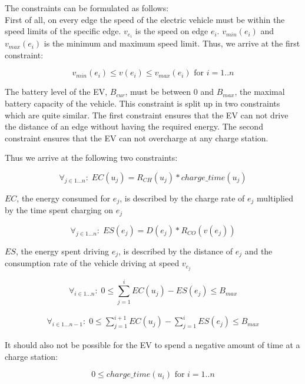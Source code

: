 The constraints can be formulated as follows: \\

First of all, on every edge the speed of the electric vehicle must be within the speed limits of the specific edge. $v_{e_i}$ is the speed on edge $e_i$. $v_{min}(e_i)$ and $v_{max}(e_i)$ is the minimum and maximum speed limit. Thus, we arrive at the first constraint:

\begin{equation}
    v_{min}(e_i) \leq v(e_i) \leq v_{max}(e_i) \text{ for } i = 1..n  
\end{equation}

The battery level of the EV, $B_{cur}$, must be between $0$ and $B_{max}$, the maximal battery capacity of the vehicle. This constraint is split up in two constraints which are quite similar. The first constraint ensures that the EV can not drive the distance of an edge without having the required energy. The second constraint ensures that the EV can not overcharge at any charge station. 

Thus we arrive at the following two constraints:

\begin{equation}
\forall_{j\in1 \dots n }:\; EC(u_j) = R_{CH}(u_j) * charge\_time(u_j)
\end{equation}

$EC$, the energy consumed for $e_j$, is described by the charge rate of $e_j$ multiplied by the time spent charging on $e_j$

\begin{equation}
\forall_{j\in1 \dots n }:\; ES(e_j) = D(e_j)*R_{CO}(v(e_j))
\end{equation} 

$ES$, the energy spent driving $e_j$, is described by the distance of $e_j$ and the consumption rate of the vehicle driving at speed $v_{e_j}$



\begin{equation}
\forall_{i\in1 \dots n }:\;0 \leq \sum_{j=1}^{i} EC(u_j) - ES(e_j) \leq B_{max} 
\end{equation}


\begin{equation}
\begin{aligned}
\forall_{i\in1 \dots n-1}:\;0 \leq \sum_{j=1}^{i+1} EC(u_j) - \sum_{j=1}^{i} ES(e_j) \leq B_{max} 
\end{aligned}
\end{equation}

It should also not be possible for the EV to spend a negative amount of time at a charge station:

\begin{equation}
0 \leq charge\_time(u_i) \text{ for } i = 1..n 
\end{equation}


